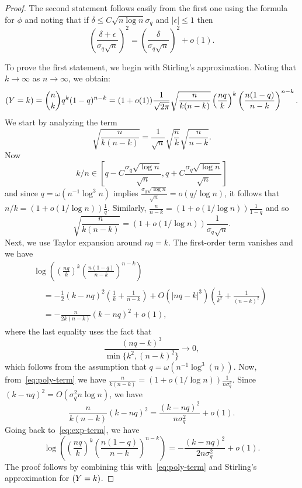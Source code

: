 \documentclass[EJP,final]{ejpecp}
\newcommand{\1}[1]{\mathbbm{1}_{\{#1\}}}
\newcommand{\eps}{\epsilon}
\let\Pr\relax
\DeclareMathOperator{\Pr}{Pr}
\begin{document}
\begin{proof}
The second statement follows easily from the first one using the formula for $\phi$ and noting that
if $\delta \leq C \sqrt{n \log n} \sigma_q$ and $|\eps| \leq 1$ then
\[
\left(\frac{\delta + \eps}{\sigma_q \sqrt{n}}\right)^2 = \left( \frac{\delta}{\sigma_q \sqrt{n}} \right)^2 + o(1).
\]

To prove the first statement, we begin with Stirling's approximation.
Noting that  $k \to \infty$ as $n \to \infty$, we obtain:
\[
\Pr(Y = k) = \binom{n}{k} q^k(1-q)^{n-k} =
(1+o(1)) \frac{1}{\sqrt{2 \pi}} \sqrt{\frac{n}{k(n-k)}}
\left(\frac{n q}{k}\right)^k \left(\frac{n(1-q)}{n-k}\right)^{n-k}.
\]
We start by analyzing the term
\[
\sqrt{\frac{n}{k(n-k)}} = \frac{1}{\sqrt{n}} \sqrt{\frac{n}{k}} \sqrt{\frac{n}{n-k}}.
\]
Now
\[
k/n \in [q - C \frac{\sigma_q \sqrt{\log n}}{\sqrt{n}}, q+ C\frac{\sigma_q \sqrt{\log n}}{\sqrt{n}}]
\]
and since $q = \omega(n^{-1} \log^3 n)$ implies $\frac{\sigma_q \sqrt{\log n}}{\sqrt{n}} = o(q/\log n)$,
it follows that $n/k = (1+o(1/\log n)) \frac 1q$. Similarly,
$\frac{n}{n-k} = (1 + o(1/\log n)) \frac{1}{1-q}$ and so
\begin{equation}\label{eq:poly-term}
\sqrt{\frac{n}{k(n-k)}} = (1+o(1/\log n)) \frac{1}{\sigma_q \sqrt{n}}.
\end{equation}
Next, we use Taylor expansion around $nq = k$. The first-order term vanishes
and we have
\begin{multline}
\log \left( \left(\frac{n q}{k}\right)^k \left(\frac{n(1-q)}{n-k}\right)^{n-k} \right) \\
\begin{aligned}
 &= -\frac{1}{2} (k-nq)^2 \left(\frac{1}{k} + \frac{1}{n-k}\right)
 + O(|nq-k|^3)\left(\frac{1}{k^2}+\frac{1}{(n-k)^2}\right)
\\ &= - \frac{n}{2k(n-k)} (k-nq)^2 + o(1),
\label{eq:exp-term}
\end{aligned}
\end{multline}
where the last equality uses the fact that
\[
\frac{(nq-k)^3}{\min\{k^2,(n-k)^2\}} \to 0,
\]
which follows from the assumption that $q = \omega(n^{-1}\log^3(n))$.
Now, from~\eqref{eq:poly-term} we have
$\frac{n}{k(n-k)} = (1 + o(1/\log n)) \frac{1}{n \sigma_q^2}$.
Since $(k-nq)^2 = O(\sigma_q^2 n \log n)$, we have
\[
\frac{n}{k(n-k)} (k-nq)^2 = \frac{(k-nq)^2}{n \sigma_q^2} + o(1).
\]
Going back to~\eqref{eq:exp-term}, we have
\[
\log \left( \left(\frac{n q}{k}\right)^k \left(\frac{n(1-q)}{n-k}\right)^{n-k} \right)
= - \frac{(k-nq)^2}{2n\sigma_q^2} + o(1).
\]
The proof follows by combining this with~\eqref{eq:poly-term}
and Stirling's approximation for $\Pr(Y = k)$.
\end{proof}
\end{document}
